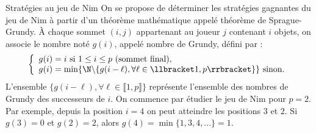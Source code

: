 \begin{exo}[PC][1][TD]{Stratégies au jeu de Nim}
 On se propose de déterminer les stratégies gagnantes du jeu de Nim à partir d’un théorème mathématique appelé théorème de Sprague-Grundy.
  À chaque sommet $(i,j)$ appartenant au joueur $j$ contenant $i$ objets, on associe le nombre noté $g(i)$, appelé nombre de Grundy, défini par :
  $$
  \left\{
  \begin{array}{l}
  g(i)=i \text{ si $1\leq i\leq p$ (sommet final)},\\
  g(i)=\min \{ \N \backslash \{g(i-\ell), \forall \ell \in \llbracket 1,p \rrbracket \} \} \text{ sinon}.
  \end{array}
  \right.
  $$
L'ensemble $\{g(i-\ell), \forall \ell \in \llbracket 1,p \rrbracket \} $ représente l'ensemble des nombres de Grundy des successeurs de $i$.
  On commence par étudier le jeu de Nim pour $p=2$.
  Par exemple, depuis la position $i=4$ on peut atteindre les positions $3$ et $2$. Si $g(3)=0$ et $g(2)=2$, alors $g(4)=\min\{1,3,4,...\}=1$.


\end{exo}
